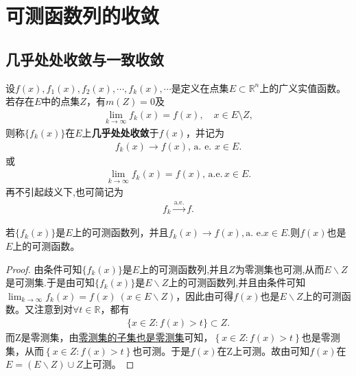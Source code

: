 \documentclass[../../main.tex]{subfiles}%
\begin{document}
\section{可测函数列的收敛}

\subsection{几乎处处收敛与一致收敛}

\begin{definition}[几乎处处收敛]
设$f(x), f_1(x), f_2(x), \cdots, f_k(x), \cdots$是定义在点集$E \subset \mathbb{R}^n$上的广义实值函数。若存在$E$中的点集$Z$，有$m(Z) = 0$及
\begin{align*}
\lim_{k \to \infty} f_k(x) = f(x), \quad x \in E \setminus Z,
\end{align*}
则称$\{f_k(x)\}$在$E$上\textbf{几乎处处收敛}于$f(x)$，并记为
\begin{align*}
f_k(x) \to f(x),\,\text{a. e. } x \in E.
\end{align*}
或
\begin{align*}
\lim_{k \to \infty} f_k(x) = f(x),\,\text{a.e.}\, x \in E.
\end{align*}
再不引起歧义下,也可简记为
\begin{align*}
f_k\xrightarrow{\mathrm{a}.\mathrm{e}.}f.
\end{align*}
\end{definition}

\begin{theorem}
若$\{f_k(x)\}$是$E$上的可测函数列，并且$f_k(x) \to f(x),\text{a. e.} x \in E.$则$f(x)$也是$E$上的可测函数。
\end{theorem}
\begin{proof}

由条件可知\(\{ f_k(x) \}\)是\(E\)上的可测函数列,并且$Z$为零测集也可测,从而\(E\backslash Z\)是可测集.于是由可知\(\{ f_k(x) \}\)是\(E\backslash Z\)上的可测函数列,并且由条件可知\(\lim_{k\rightarrow \infty}f_k(x) =f(x) \ (x\in E\backslash Z)\)，因此由可得\(f(x)\)也是\(E\backslash Z\)上的可测函数。又注意到对\(\forall t\in \mathbb{R}\)，都有
\begin{align*}
\{ x\in Z:f (x) >t \} \subset Z.
\end{align*}
而Z是零测集，由\hyperref[proposition:零测集的基本性质]{零测集的子集也是零测集}可知，\(\left\{ x\in Z:f(x) >t \right\}\)也是零测集，从而\(\left\{ x\in Z:f(x) >t \right\}\)也可测。于是\(f(x)\)在Z上可测。故由可知\(f(x)\)在\(E=(E\backslash Z)\cup Z\)上可测。

\end{proof}
\end{document}
